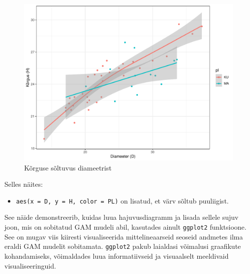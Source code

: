 \documentclass[
]{book}
\providecommand{\tightlist}{%
  \setlength{\itemsep}{0pt}\setlength{\parskip}{0pt}}
\begin{document}
\begin{figure}[!ht]
\includegraphics[width=0.8\linewidth]{_main_files/figure-latex/unnamed-chunk-92-1} \caption{Kõrguse sõltuvus diameetrist}\label{fig:unnamed-chunk-92}
\end{figure}

Selles näites:

\begin{itemize}
\tightlist
\item
  \texttt{aes(x\ =\ D,\ y\ =\ H,\ color\ =\ PL)} on lisatud, et värv sõltub puuliigist.
\end{itemize}

See näide demonstreerib, kuidas luua hajuvusdiagramm ja lisada sellele sujuv joon, mis on sobitatud GAM mudeli abil, kasutades ainult \texttt{ggplot2} funktsioone. See on mugav viis kiiresti visualiseerida mittelineaarseid seoseid andmetes ilma eraldi GAM mudelit sobitamata. \texttt{ggplot2} pakub laialdasi võimalusi graafikute kohandamiseks, võimaldades luua informatiivseid ja visuaalselt meeldivaid visualiseeringuid.


\end{document}
